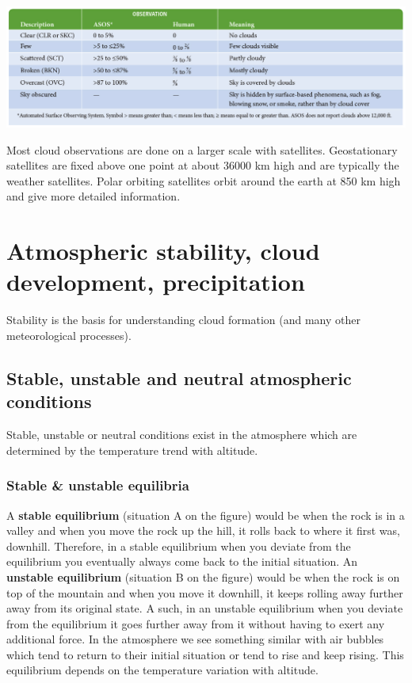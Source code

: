 \documentclass[12pt,oneside]{book}
\begin{document}
\begin{center}
\label{table:skycond}

\begin{center}\includegraphics[width=0.8\linewidth]{figures/Table25} \end{center}
\end{center}

Most cloud observations are done on a larger scale with satellites.
Geostationary satellites are fixed above one point at about 36000 km
high and are typically the weather satellites. Polar orbiting satellites
orbit around the earth at 850 km high and give more detailed
information.

\chapter{Atmospheric stability, cloud development,
precipitation}\label{atmospheric-stability-cloud-development-precipitation}


Stability is the basis for understanding cloud formation (and many other
meteorological processes).

\section{Stable, unstable and neutral atmospheric
conditions}\label{stable-unstable-and-neutral-atmospheric-conditions}

Stable, unstable or neutral conditions exist in the atmosphere which are
determined by the temperature trend with altitude.

\subsection{Stable \& unstable
equilibria}\label{stable-unstable-equilibria}

A \textbf{stable equilibrium} (situation A on the figure) would be when
the rock is in a valley and when you move the rock up the hill, it rolls
back to where it first was, downhill. Therefore, in a stable equilibrium
when you deviate from the equilibrium you eventually always come back to
the initial situation. An \textbf{unstable equilibrium} (situation B on
the figure) would be when the rock is on top of the mountain and when
you move it downhill, it keeps rolling away further away from its
original state. A such, in an unstable equilibrium when you deviate from
the equilibrium it goes further away from it without having to exert any
additional force. In the atmosphere we see something similar with air
bubbles which tend to return to their initial situation or tend to rise
and keep rising. This equilibrium depends on the temperature variation
with altitude.
\end{document}
